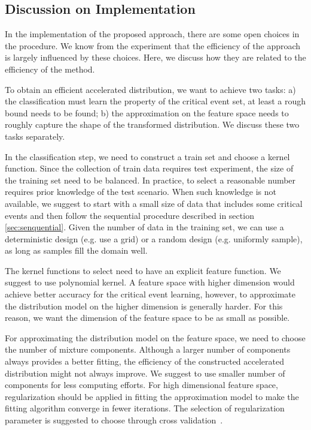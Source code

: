 \documentclass[letterpaper, 10 pt, journal]{IEEEtran}  %
\begin{document}
\subsection{Discussion on Implementation}\label{sec:implement}

In the implementation of the proposed approach, there are some open choices in the procedure. We know from the experiment  that the efficiency of the approach is largely influenced by these choices. Here, we discuss how they are related to the efficiency of the method.

To obtain an efficient accelerated distribution, we want to achieve two tasks: a) the classification must learn the property of the critical event set, at least a rough bound needs to be found; b) the approximation on the feature space needs to roughly capture the shape of the transformed distribution. We discuss these two tasks separately.

In the classification step, we need to construct a train set and choose a kernel function. Since the collection of train data requires test experiment, the size of the training set need to be balanced. In practice, to select a reasonable number requires prior knowledge of the test scenario. When such knowledge is not available, we suggest to start with a small size of data that includes some critical events and then follow the sequential procedure described in section \ref{sec:senquential}. Given the number of data in the training set, we can use a deterministic design (e.g. use a grid) or a random design (e.g. uniformly sample), as long as samples fill the domain well. 

The kernel functions to select need to have an explicit feature function. We suggest to use polynomial kernel. A feature space with higher dimension would achieve better accuracy for the critical event learning, however, to approximate the distribution model on the higher dimension is generally harder. For this reason, we want the dimension of the feature space to be as small as possible.

For approximating the distribution model on the feature space, we need to choose the number of mixture components. Although a larger number of components always provides a better fitting, the efficiency of the constructed accelerated distribution might not always improve. We suggest to use smaller number of components for less computing efforts. For high dimensional feature space, regularization should be applied in fitting the approximation model to make the fitting algorithm converge in fewer iterations. The selection of regularization parameter is suggested to choose through cross validation~\cite{bishop2006pattern}.
\end{document}
